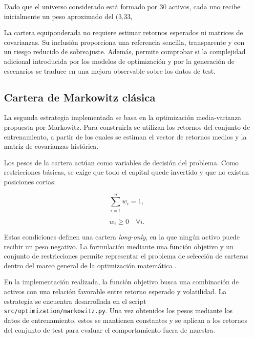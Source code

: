 Dado que el universo considerado está formado por 30 activos, cada uno recibe inicialmente un peso aproximado del (3{,}33,%

La cartera equiponderada no requiere estimar retornos esperados ni matrices de covarianzas. Su inclusión proporciona una referencia sencilla, transparente y con un riesgo reducido de sobreajuste. Además, permite comprobar si la complejidad adicional introducida por los modelos de optimización y por la generación de escenarios se traduce en una mejora observable sobre los datos de test.

\subsection{Cartera de Markowitz clásica}

La segunda estrategia implementada se basa en la optimización media-varianza propuesta por Markowitz. Para construirla se utilizan los retornos del conjunto de entrenamiento, a partir de los cuales se estiman el vector de retornos medios y la matriz de covarianzas histórica.

Los pesos de la cartera actúan como variables de decisión del problema. Como restricciones básicas, se exige que todo el capital quede invertido y que no existan posiciones cortas:

\begin{equation}
\sum_{i=1}^{n} w_i = 1,
\end{equation}

\begin{equation}
w_i \geq 0 \quad \forall i.
\end{equation}

Estas condiciones definen una cartera \textit{long-only}, en la que ningún activo puede recibir un peso negativo. La formulación mediante una función objetivo y un conjunto de restricciones permite representar el problema de selección de carteras dentro del marco general de la optimización matemática \cite{boyd2004convex}.

En la implementación realizada, la función objetivo busca una combinación de activos con una relación favorable entre retorno esperado y volatilidad. La estrategia se encuentra desarrollada en el script \texttt{src/optimization/markowitz.py}. Una vez obtenidos los pesos mediante los datos de entrenamiento, estos se mantienen constantes y se aplican a los retornos del conjunto de test para evaluar el comportamiento fuera de muestra.

